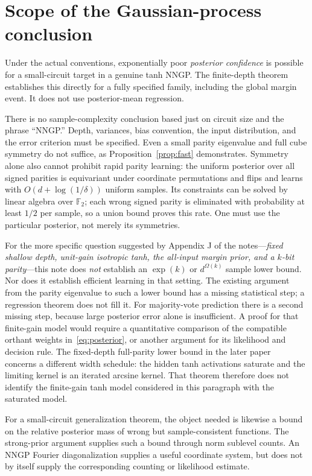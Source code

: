\documentclass[11pt]{article}
\theoremstyle{remark}\newtheorem{remark}[theorem]{Remark}
\begin{document}
\section{Scope of the Gaussian-process conclusion}\label{sec:scope}
Under the actual conventions, exponentially poor \emph{posterior confidence} is possible for a small-circuit target in a genuine tanh NNGP. The finite-depth theorem establishes this directly for a fully specified family, including the global margin event. It does not use posterior-mean regression.

There is no sample-complexity conclusion based just on circuit size and the phrase ``NNGP.'' Depth, variances, bias convention, the input distribution, and the error criterion must be specified. Even a small parity eigenvalue and full cube symmetry do not suffice, as Proposition~\ref{prop:fast} demonstrates. Symmetry alone also cannot prohibit rapid parity learning: the uniform posterior over all signed parities is equivariant under coordinate permutations and flips and learns with $O(d+\log(1/\delta))$ uniform samples. Its constraints can be solved by linear algebra over $\mathbb F_2$; each wrong signed parity is eliminated with probability at least $1/2$ per sample, so a union bound proves this rate. One must use the particular posterior, not merely its symmetries.

For the more specific question suggested by Appendix J of the notes---\emph{fixed shallow depth, unit-gain isotropic tanh, the all-input margin prior, and a $k$-bit parity}---this note does \emph{not} establish an $\exp(k)$ or $d^{\Omega(k)}$ sample lower bound. Nor does it establish efficient learning in that setting. The existing argument from the parity eigenvalue to such a lower bound has a missing statistical step; a regression theorem does not fill it. For majority-vote prediction there is a second missing step, because large posterior error alone is insufficient. A proof for that finite-gain model would require a quantitative comparison
of the compatible orthant weights in~\eqref{eq:posterior}, or another
argument for its likelihood and decision rule. The fixed-depth full-parity
lower bound in the later paper~\cite{subcritical-exponential} concerns a
different width schedule: the hidden tanh activations saturate and the
limiting kernel is an iterated arcsine kernel. That theorem therefore
does not identify the finite-gain tanh model considered in this paragraph
with the saturated model.

For a small-circuit generalization theorem, the object needed is likewise a bound on the relative posterior mass of wrong but sample-consistent functions. The strong-prior argument supplies such a bound through norm sublevel counts. An NNGP Fourier diagonalization supplies a useful coordinate system, but does not by itself supply the corresponding counting or likelihood estimate.
\end{document}
